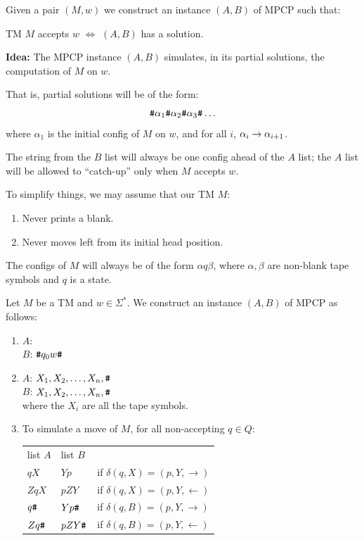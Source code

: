 \begin{frame}
\begin{center}
\end{center}

Given a pair $(M,w)$ we construct an instance $(A,B)$ of MPCP such
that: 

TM $M$ accepts $w$ $\iff$ $(A,B)$ has a solution.

{\bf Idea:}  The MPCP instance $(A,B)$ simulates, in its partial
solutions, the computation of $M$ on $w$.

That is, partial solutions will be of the form:
$$
\texttt{\#}\alpha_1\texttt{\#}\alpha_2\texttt{\#}\alpha_3\texttt{\#}\ldots
$$
where $\alpha_1$ is the initial config of $M$ on $w$, and for all $i$,
$\alpha_i\rightarrow\alpha_{i+1}$.

The string from the $B$ list will always be one config ahead of the $A$
list; the $A$ list will be allowed to ``catch-up'' only when $M$
accepts $w$.
\end{frame}

\begin{frame}
To simplify things,
we may assume that our TM $M$:
\begin{enumerate}
\item  Never prints a blank.
\item  Never moves left from its initial head position.
\end{enumerate}

The configs of $M$ will always be of the form $\alpha q\beta$, where
$\alpha,\beta$ are non-blank tape symbols and $q$ is a state.
\end{frame}

\begin{frame}
Let $M$ be a TM and $w\in\Sigma^*$.  We
construct an instance $(A,B)$ of MPCP as follows:
\begin{enumerate}
\item 
$A$: \hsh  \\
$B$: $\texttt{\#} q_0w\texttt{\#}$ 

\item 
$A$: $X_1,X_2,\ldots,X_n,\texttt{\#}$ \\
$B$: $X_1,X_2,\ldots,X_n,\texttt{\#}$ \\
where the $X_i$ are all the tape symbols.

\item To simulate a move of $M$, for all non-accepting $q\in Q$:
\begin{center}
\begin{tabular}{lll}
list $A$ & list $B$ & \\
$qX$     & $Yp$     & if $\delta(q,X)=(p,Y,\rightarrow)$ \\
$ZqX$    & $pZY$    & if $\delta(q,X)=(p,Y,\leftarrow)$ \\
$q\texttt{\#}$    & $Yp\texttt{\#}$   & if $\delta(q,B)=(p,Y,\rightarrow)$ \\
$Zq\texttt{\#}$   & $pZY\texttt{\#}$  & if $\delta(q,B)=(p,Y,\leftarrow)$
\end{tabular}
\end{center}
\end{enumerate}
\end{frame}

